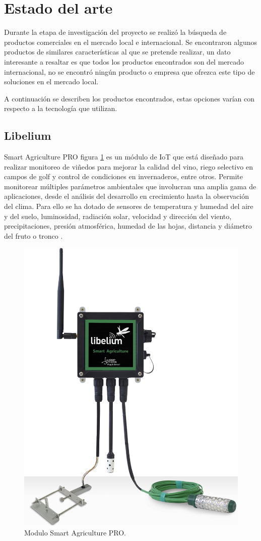 \section{Estado del arte}

Durante la etapa de investigación del proyecto se realizó la búsqueda de productos comerciales en el mercado local e internacional.
Se encontraron algunos productos de similares características al que se pretende realizar, un dato interesante a resaltar es que todos los productos encontrados son del mercado internacional, no se encontró ningún producto o empresa que ofrezca este tipo de soluciones
en el mercado local.

A continuación se describen los productos encontrados, estas opciones varían con respecto a la tecnología que utilizan.

\subsection{Libelium}

Smart Agriculture PRO figura \ref{fig:Modulo-libelium} es un módulo de IoT que está diseñado para realizar monitoreo de viñedos para mejorar la calidad del vino, riego selectivo en campos de golf y control de condiciones en invernaderos, entre otros.
Permite monitorear múltiples parámetros ambientales que involucran una amplia gama de aplicaciones, desde el análisis del desarrollo en crecimiento hasta la observación del clima. Para ello se ha dotado de sensores de temperatura y humedad del aire y del suelo, luminosidad, radiación solar, velocidad y dirección del viento, precipitaciones, presión atmosférica, humedad de las hojas, distancia y diámetro del fruto o tronco \citep{ModuloAgriculture}.
\vspace{1cm}

\begin{figure}[htbp]
	\centering
	\includegraphics[width=.4\textwidth]{./Figures/modulo_libelium.png}
	\caption{Modulo Smart Agriculture PRO.}
	\label{fig:Modulo-libelium}
\end{figure}

